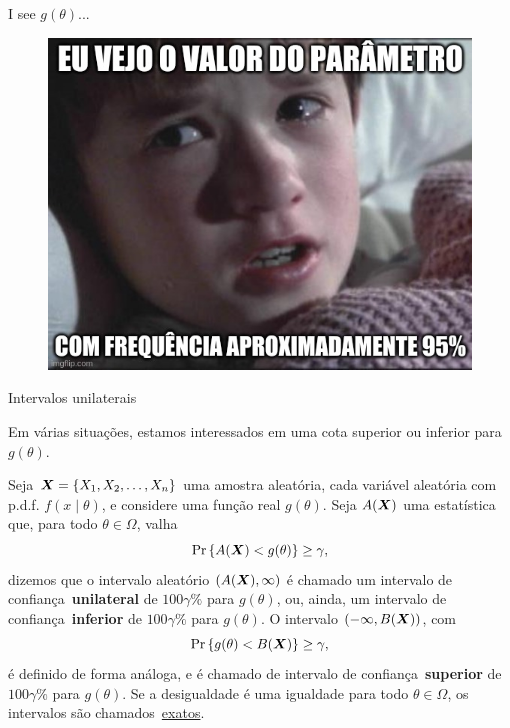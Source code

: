 \begin{frame}{I see $g(\theta)$...}

\begin{figure}[!ht]
\label{fig:freq_meme}
\begin{center}
\includegraphics[scale=0.45]{figures/freq_meme.jpg} 
\end{center} 
\end{figure} 
\end{frame}

\begin{frame}{Intervalos unilaterais}

Em várias situações, estamos interessados em uma cota superior ou inferior para $g(\theta)$.
\begin{defn}
  Seja $\boldsymbol{X} = \{ X_1, X_2, \ldots, X_n \}$ uma amostra aleatória, cada variável aleatória com p.d.f. $f(x\mid \theta)$, e considere uma função real $g(\theta)$.
  Seja $A(\boldsymbol{X})$ uma estatística que, para todo $\theta \in \Omega$, valha
  \begin{equation*}
   \operatorname{Pr}\left\{A(\boldsymbol{X}) < g(\theta)\right\} \geq \gamma,
  \end{equation*}
dizemos que o intervalo aleatório $(A(\boldsymbol{X}), \infty)$ é chamado um intervalo de confiança~\textbf{unilateral} de $100\gamma\%$ para $g(\theta)$, ou, ainda, um intervalo de confiança~\textbf{inferior} de $100\gamma\%$ para $g(\theta)$.
O intervalo $(-\infty, B(\boldsymbol{X}))$, com
  \begin{equation*}
   \operatorname{Pr}\left\{g(\theta) < B(\boldsymbol{X}) \right\} \geq \gamma,
  \end{equation*}
é definido de forma análoga, e é chamado de intervalo de confiança~\textbf{superior} de $100\gamma\%$ para $g(\theta)$.
Se a desigualdade é uma igualdade para todo $\theta \in \Omega$, os intervalos são chamados~\underline{exatos}.
\end{defn}
\end{frame}


